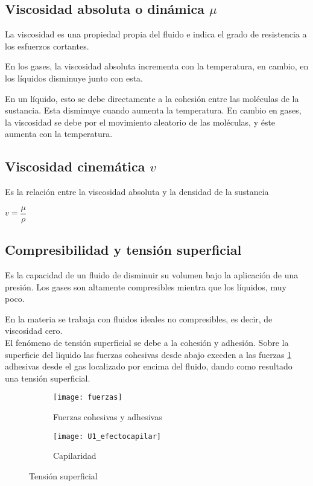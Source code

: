 \subsection{Viscosidad absoluta o dinámica $\mu$}
La viscosidad es una propiedad propia del fluido e indica el grado de resistencia a los esfuerzos cortantes.

En los gases, la viscosidad absoluta incrementa con la temperatura, en cambio, en los líquidos disminuye junto con esta. 

En un líquido, esto se debe directamente a la cohesión entre las moléculas de la sustancia. Esta disminuye cuando aumenta la temperatura. En cambio en gases, la viscosidad se debe por el movimiento aleatorio de las moléculas, y éste aumenta con la temperatura.

\subsection{Viscosidad cinemática $v$}

Es la relación entre la viscosidad absoluta y la densidad de la sustancia
\begin{center}
	$v = \dfrac{\mu}{\rho}$
\end{center}

\subsection{Compresibilidad y tensión superficial}
Es la capacidad de un fluido de disminuir su volumen bajo la aplicación de una presión. Los gases son altamente compresibles mientra que los líquidos, muy poco. 

En la materia \materia se trabaja con fluidos ideales no compresibles, es decir, de viscosidad cero.\\

El fenómeno de tensión superficial se debe a la cohesión y adhesión. Sobre la superficie del liquido las fuerzas cohesivas desde abajo exceden a las fuerzas \ref{fuerzas_cohesivas_adhesivas} adhesivas desde el gas localizado por encima del fluido, dando como resultado una tensión superficial.

\begin{figure}[h]
	\centering
	\begin{subfigure}[b]{.45\linewidth}
		\flushright
		\texttt{[image: fuerzas]}
		\caption{Fuerzas cohesivas y adhesivas}
		\label{fuerzas_cohesivas_adhesivas}
	\end{subfigure}
	\begin{subfigure}[b]{.45\linewidth}
		\flushleft
		\texttt{[image: U1\_efectocapilar]}
		\caption{Capilaridad}
		\label{capilaridad}
	\end{subfigure}
	\caption{Tensión superficial}
\end{figure}

